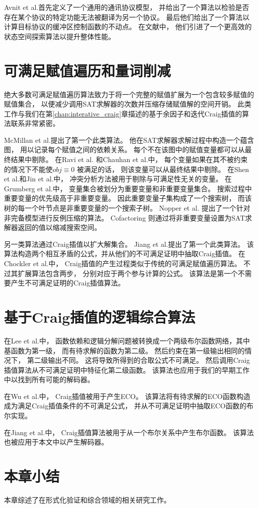 Avnit et al.首先定义了一个通用的通讯协议模型，
并给出了一个算法以检验是否存在某个协议的特定功能无法被翻译为另一个协议。
最后他们给出了一个算法以计算目标协议的缓冲区控制函数的不动点。
在文献中，
他们引进了一个更高效的状态空间探索算法以提升整体性能。

\section{可满足赋值遍历和量词削减}\label{subsec_relallsat}

绝大多数可满足赋值遍历算法致力于将一个完整的赋值扩展为一个包含较多赋值的赋值集合，
以便减少调用SAT求解器的次数并压缩存储赋值解的空间开销。
此类工作与我们在第\ref{chap:interative_craig}章描述的基于余因子和迭代Craig插值的算法联系非常紧密。

McMillan et al.提出了第一个此类算法。
他在SAT求解器求解过程中构造一个蕴含图，
用以记录每个赋值之间的依赖关系。
每个不在该图中的赋值变量都可以从最终结果中剔除。
在Ravi et al. 和Chauhan et al.中，
每个变量如果在其不被约束的情况下不能使$obj\equiv 0$ 被满足的话，
则该变量可以从最终结果中剔除。
在Shen et al.和Jin et al.中，
冲突分析方法被用于剔除与可满足性无关的变量。
在Grumberg et al.中，
变量集合被划分为重要变量和非重要变量集合。
搜索过程中重要变量的优先级高于非重要变量。
因此重要变量子集构成了一个搜索树，
而该树的每一个叶节点是非重要变量的一个搜索子树。
Nopper et al. 提出了一个针对非完备模型进行反例压缩的算法。
Cofactoring  则通过将非重要变量设置为SAT求解器返回的值以缩减搜索空间。

另一类算法通过Craig插值以扩大解集合。
Jiang et al.提出了第一个此类算法。
该算法构造两个相互矛盾的公式，并从他们的不可满足证明中抽取Craig插值。
在Chockler et al.中，
Craig插值的产生过程类似于传统的可满足赋值遍历算法。
不过其扩展算法包含两步，
分别对应于两个参与计算的公式。
该算法是第一个不需要产生不可满足证明的Craig插值算法。

\section{基于Craig插值的逻辑综合算法}
在Lee et al.中，
函数依赖和逻辑分解问题被转换成一个两级布尔函数网络，其中基函数为第一级，
而有待求解的函数为第二级。
然后约束在第一级输出相同的情况下，
第二级输出不同。
这将导致所得到的合取公式不可满足。
然后调用Craig插值算法从不可满足证明中特征化第二级函数。
该算法也应用于我们的早期工作 中以找到所有可能的解码器。

在Wu et al.中，
Craig插值被用于产生ECO。
该算法将有待求解的ECO函数构造成为满足Craig插值条件的不可满足公式，
并从不可满足证明中抽取ECO函数的布尔实现。

在Jiang et al.中，
Craig插值算法被用于从一个布尔关系中产生布尔函数。
该算法也被应用于本文中以产生解码器。

\section{本章小结}
本章综述了在形式化验证和综合领域的相关研究工作。

